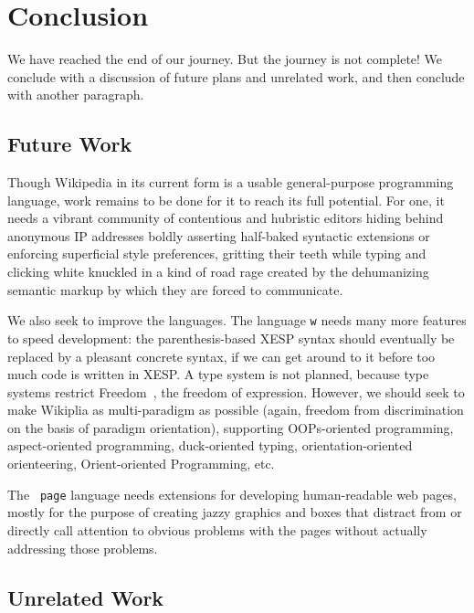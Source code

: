 \documentclass[twocolumn]{article}
\begin{document}
\section{Conclusion} \label{sec:conc}

We have reached the end of our journey. But the journey is not
complete! We conclude with a discussion of future plans and unrelated
work, and then conclude with another paragraph.

\subsection{Future Work}

Though Wikipedia in its current form is a usable general-purpose
programming language, work remains to be done for it to reach its full
potential. For one, it needs a vibrant community of contentious and
hubristic editors hiding behind anonymous IP addresses boldly
asserting half-baked syntactic extensions or enforcing superficial
style preferences, gritting their teeth while typing and clicking
white knuckled in a kind of road rage created by
the dehumanizing semantic markup by which they are forced to
communicate.


We also seek to improve the languages. The language {\tt w} needs many
more features to speed development: the parenthesis-based XESP syntax
should eventually be replaced by a pleasant concrete syntax, if we can
get around to it before too much code is written in XESP. A type
system is not planned, because type systems
restrict Freedom~\fexpression, the freedom of expression. However, we
should seek to make Wikiplia as multi-paradigm as possible (again,
freedom from discrimination on the basis of paradigm
orientation), supporting OOPs-oriented
programming,\z{} aspect-oriented
programming,\z{} duck-oriented
typing,\z{} orientation-oriented
orienteering,\z{} Orient-oriented
Programming,\z{} etc.

The {\tt
page} language needs extensions for developing human-readable web
pages, mostly for the purpose of creating jazzy graphics and boxes
that distract from or directly call attention to obvious problems with
the pages without actually addressing those problems.

\subsection{Unrelated Work}
\end{document}
